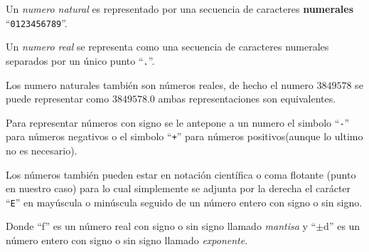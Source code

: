       Un {\it numero natural} es representado por una secuencia de caracteres {\bf numerales} ``\texttt{0123456789}''.
      
      \begin{fxcode}
          
      \end{fxcode}
      
      Un {\it numero real} se representa como una secuencia de caracteres numerales separados por un único punto ``\texttt{.}''.
      
      \begin{fxcode}
          
      \end{fxcode}
      
      Los numero naturales también son números reales, de hecho el numero $3849578$ se puede representar como $3849578.0$ ambas representaciones son equivalentes.
      
      Para representar números con signo se le antepone a un numero el simbolo ``\texttt{-}'' para números negativos o el simbolo ``\texttt{+}'' para números positivos(aunque lo ultimo no es necesario).
      
      \begin{fxcode}
      \end{fxcode}
      
      Los números también pueden estar en notación científica o coma flotante (punto en nuestro caso) para lo cual simplemente se adjunta por la derecha el carácter ``\texttt{E}'' en mayúscula o minúscula seguido de un número entero con signo o sin signo.
      
      \begin{center}
      \end{center}
      
      Donde ``f'' es un número real con signo o sin signo llamado {\it mantisa} y ``$\pm$d'' es un número entero con signo o sin signo llamado {\it exponente}.
      
      \begin{fxcode}
      \end{fxcode}
      
      \begin{fxcode}
      \end{fxcode}
      
